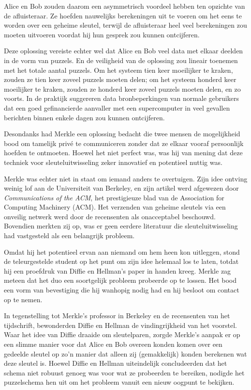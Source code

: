 \documentclass[smalldemyvopaper,11pt,twoside,onecolumn,openright,extrafontsizes,hidelinks]{memoir}
\begin{document}
Alice en Bob zouden daarom een asymmetrisch voordeel hebben ten opzichte
van de afluisteraar. Ze hoefden nauwelijks berekeningen uit te voeren om
het eens te worden over een geheime sleutel, terwijl de afluisteraar
heel veel berekeningen zou moeten uitvoeren voordat hij hun gesprek zou
kunnen ontcijferen.

Deze oplossing vereiste echter wel dat Alice en Bob veel data met elkaar
deelden in de vorm van puzzels. En de veiligheid van de oplossing zou
lineair toenemen met het totale aantal puzzels. Om het systeem tien keer
moeilijker te kraken, zouden ze tien keer zoveel puzzels moeten delen;
om het systeem honderd keer moeilijker te kraken, zouden ze honderd keer
zoveel puzzels moeten delen, en zo voorts. In de praktijk suggereren
data bronbeperkingen van normale gebruikers dat een goed gefinancierde
aanvaller met een supercomputer in veel gevallen berichten binnen enkele
dagen zou kunnen ontcijferen.

Desondanks had Merkle een oplossing bedacht die twee mensen de
mogelijkheid bood om tamelijk privé te communiceren zonder dat ze elkaar
vooraf persoonlijk hoefden te ontmoeten. Hoewel het niet perfect was,
was hij van mening dat deze techniek voor sleuteluitwisseling zeker
innovatief en potentieel nuttig was.

Merkle was echter niet in staat om iemand anders te overtuigen. Zijn
idee ontving weinig lof aan de Universiteit van Berkeley, en zijn
artikel werd afgewezen door \emph{Communications of the ACM}, het
prestigieuze blad van de Association for Computing Machinery (ACM). Het
verzenden van geheime sleutels via een onveilig netwerk werd door de
recensenten als onacceptabel beschouwd. Bovendien merkten zij op, was er
geen eerdere literatuur die sleuteluitwisseling had vastgesteld als een
belangrijk probleem.

Omdat hij het potentieel ervan aan niemand om hem heen kon uitleggen,
stond de teleurgestelde student op het punt om zijn idee helemaal los te
laten, totdat hij een proefdruk van Diffie en Hellman's paper in handen
kreeg. Merkle zag meteen dat het duo een soortgelijk probleem probeerde
op te lossen. Het bood een vorm van bevestiging die hij wanhopig nodig
had en hij besloot om contact op te nemen.

In tegenstelling tot Merkle's professor in Berkeley en de recensenten
van het tijdschrift, bewonderden Diffie en Hellman de vindingrijkheid
van het voorstel. Waar het idee van Diffie draaide om sleutelparen,
zorgde Merkle's aanpak er op een slimme manier voor dat Alice en Bob
overeen konden komen over een gedeelde sleutel op zo'n manier dat alleen
zij (gemakkelijk) konden berekenen wat deze sleutel is. Hoewel Diffie en
Hellman uiteindelijk concludeerden dat het schema niet robuust genoeg
was voor wat ze probeerden te bereiken, nodigde het puzzelschema hen uit
om het probleem vanuit een nieuw oogpunt te bekijken.
\end{document}
